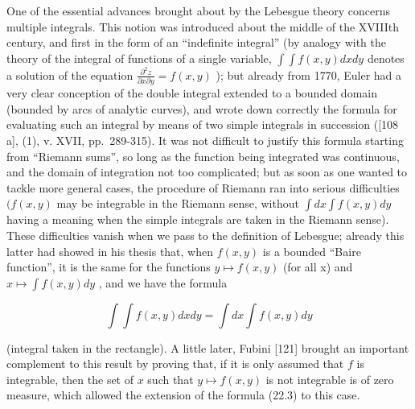One of the essential advances brought about by the Lebesgue theory concerns multiple integrals. This notion was introduced about the middle of the XVIIIth century, and first in the form of an ``indefinite integral'' (by analogy with the theory of the integral of functions of a single variable, \(\int\int f(x,y)dx dy\) denotes a solution of the equation \(\frac{\partial^{2}z}{\partial x\partial y}=f(x,y)\) ); but already from 1770, Euler had a very clear conception of the double integral extended to a bounded domain (bounded by arcs of analytic curves), and wrote down correctly the formula for evaluating such an integral by means of two simple integrals in succession ({[}108 a{]}, (1), v. XVII, pp.~289-315). It was not difficult to justify this formula starting from ``Riemann sums'', so long as the function being integrated was continuous, and the domain of integration not too complicated; but as soon as one wanted to tackle more general cases, the procedure of Riemann ran into serious difficulties \((f(x,y)\) may be integrable in the Riemann sense, without \(\int dx\int f(x,y)dy\) having a meaning when the simple integrals are taken in the Riemann sense). These difficulties vanish when we pass to the definition of Lebesgue; already this latter had showed in his thesis that, when \(f(x,y)\) is a bounded ``Baire function'', it is the same for the functions \(y\mapsto f(x,y)\) (for all x) and \(x\mapsto\int f(x,y)dy\) , and we have the formula

\[
\int \int f (x, y) d x d y = \int d x \int f (x, y) d y\tag{22.3}
\]

(integral taken in the rectangle). A little later, Fubini {[}121{]} brought an important complement to this result by proving that, if it is only assumed that \(f\) is integrable, then the set of \(x\) such that \(y \mapsto f(x, y)\) is not integrable is of zero measure, which allowed the extension of the formula (22.3) to this case.

